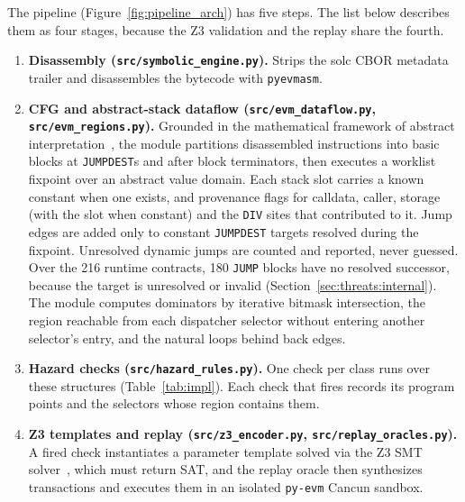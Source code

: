 \documentclass[pdflatex,sn-mathphys]{sn-jnl}
\theoremstyle{thmstyleone}
\theoremstyle{thmstyletwo}
\begin{document}
The pipeline (Figure~\ref{fig:pipeline_arch}) has five steps. The list below describes them as four stages, because the Z3 validation and the replay share the fourth.
\begin{enumerate}
    \item \textbf{Disassembly (\texttt{src/symbolic\_engine.py}).} Strips the solc CBOR metadata trailer and disassembles the bytecode with \texttt{pyevmasm}.
    \item \textbf{CFG and abstract-stack dataflow (\texttt{src/evm\_dataflow.py}, \texttt{src/evm\_regions.py}).} Grounded in the mathematical framework of abstract interpretation~\cite{cousot1977abstract}, the module partitions disassembled instructions into basic blocks at \texttt{JUMPDEST}s and after block terminators, then executes a worklist fixpoint over an abstract value domain. Each stack slot carries a known constant when one exists, and provenance flags for calldata, caller, storage (with the slot when constant) and the \texttt{DIV} sites that contributed to it. Jump edges are added only to constant \texttt{JUMPDEST} targets resolved during the fixpoint. Unresolved dynamic jumps are counted and reported, never guessed. Over the 216 runtime contracts, 180 \texttt{JUMP} blocks have no resolved successor, because the target is unresolved or invalid (Section~\ref{sec:threats:internal}). The module computes dominators by iterative bitmask intersection, the region reachable from each dispatcher selector without entering another selector's entry, and the natural loops behind back edges.
    \item \textbf{Hazard checks (\texttt{src/hazard\_rules.py}).} One check per class runs over these structures (Table~\ref{tab:impl}). Each check that fires records its program points and the selectors whose region contains them.
    \item \textbf{Z3 templates and replay (\texttt{src/z3\_encoder.py}, \texttt{src/replay\_oracles.py}).} A fired check instantiates a parameter template solved via the Z3 SMT solver~\cite{de2008z3}, which must return SAT, and the replay oracle then synthesizes transactions and executes them in an isolated \texttt{py-evm} Cancun sandbox.
\end{enumerate}
\end{document}
